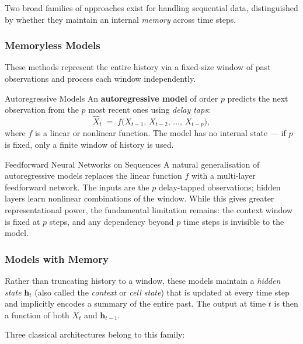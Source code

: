 \documentclass[11pt,a4paper]{article}
\newcommand{\term}[1]{\textcolor{DefGreen}{\textbf{#1}}\index{#1}}
\begin{document}
Two broad families of approaches exist for handling sequential data, distinguished by whether they maintain an internal \emph{memory} across time steps.

\subsubsection{Memoryless Models}

These methods represent the entire history via a fixed-size window of past observations and process each window independently.

\begin{defbox}{Autoregressive Models}
An \term{autoregressive model} of order $p$ predicts the next observation from the $p$ most recent ones using \emph{delay taps}:
\[
  \hat{X}_t \;=\; f\bigl(X_{t-1},\, X_{t-2},\, \ldots,\, X_{t-p}\bigr),
\]
where $f$ is a linear or nonlinear function. The model has no internal state — if $p$ is fixed, only a finite window of history is used.
\end{defbox}

\begin{defbox}{Feedforward Neural Networks on Sequences}
A natural generalisation of autoregressive models replaces the linear function $f$ with a multi-layer feedforward network. The inputs are the $p$ delay-tapped observations; hidden layers learn nonlinear combinations of the window. While this gives greater representational power, the fundamental limitation remains: the context window is fixed at $p$ steps, and any dependency beyond $p$ time steps is invisible to the model.
\end{defbox}

\subsubsection{Models with Memory}

Rather than truncating history to a window, these models maintain a \emph{hidden state} $\mathbf{h}_t$ (also called the \emph{context} or \emph{cell state}) that is updated at every time step and implicitly encodes a summary of the entire past. The output at time $t$ is then a function of both $X_t$ and $\mathbf{h}_{t-1}$.

Three classical architectures belong to this family:
\end{document}
